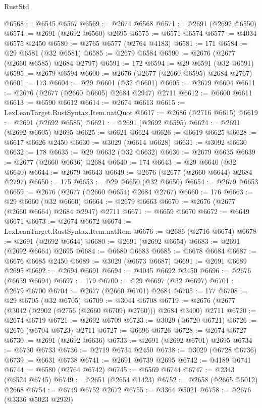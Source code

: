 \begin{lexlean}{RustStd}
\begin{coremodule}
@6568 := @6545 @6567
@6569 := @2674 @6568
@6571 := @2691 (@2692 @6550)
@6574 := @2691 (@2692 @6560) @2695
@6575 := @6571 @6574
@6577 := @4034 @6575 @2450
@6580 := @2765 @6577 (@2764 @4183)
@6581 := 171
@6584 := @29 @6581 (@32 @6581)
@6585 := @2679 @6584
@6590 := @2676 (@2677 (@2660 @6585) @2684 @2797)
@6591 := 172
@6594 := @29 @6591 (@32 @6591)
@6595 := @2679 @6594
@6600 := @2676 (@2677 (@2660 @6595) @2684 @2767)
@6601 := 173
@6604 := @29 @6601 (@32 @6601)
@6605 := @2679 @6604
@6611 := @2676 (@2677 (@2660 @6605) @2684 @2947) @2711
@6612 := @6600 @6611
@6613 := @6590 @6612
@6614 := @2674 @6613
@6615 := LexLeanTarget.RustSyntax.Item.natQuot
@6617 := @2686 (@2716 @6615)
@6619 := @2691 (@2692 @6585)
@6621 := @2691 (@2692 @6595)
@6624 := @2691 (@2692 @6605) @2695
@6625 := @6621 @6624
@6626 := @6619 @6625
@6628 := @6617 @6626 @2450
@6630 := @3029 (@6614 @6628)
@6631 := @3092 @6630
@6632 := 178
@6635 := @29 @6632 (@32 @6632)
@6636 := @2679 @6635
@6639 := @2677 (@2660 @6636) @2684
@6640 := 174
@6643 := @29 @6640 (@32 @6640)
@6644 := @2679 @6643
@6649 := @2676 (@2677 (@2660 @6644) @2684 @2797)
@6650 := 175
@6653 := @29 @6650 (@32 @6650)
@6654 := @2679 @6653
@6659 := @2676 (@2677 (@2660 @6654) @2684 @2767)
@6660 := 176
@6663 := @29 @6660 (@32 @6660)
@6664 := @2679 @6663
@6670 := @2676 (@2677 (@2660 @6664) @2684 @2947) @2711
@6671 := @6659 @6670
@6672 := @6649 @6671
@6673 := @2674 @6672
@6674 := LexLeanTarget.RustSyntax.Item.natRem
@6676 := @2686 (@2716 @6674)
@6678 := @2691 (@2692 @6644)
@6680 := @2691 (@2692 @6654)
@6683 := @2691 (@2692 @6664) @2695
@6684 := @6680 @6683
@6685 := @6678 @6684
@6687 := @6676 @6685 @2450
@6689 := @3029 (@6673 @6687)
@6691 := @2691 @6689 @2695
@6692 := @2694 @6691
@6694 := @4045 @6692 @2450
@6696 := @2676 (@6639 @6694)
@6697 := 179
@6700 := @29 @6697 (@32 @6697)
@6701 := @2679 @6700
@6704 := @2677 (@2660 @6701) @2684
@6705 := 177
@6708 := @29 @6705 (@32 @6705)
@6709 := @3044 @6708
@6719 := @2676 (@2677 (@3042 (@2902 (@2756 (@2660 @6709) @2760))) @2684 @3400) @2711
@6720 := @2674 @6719
@6721 := @2692 @6709
@6723 := @3029 (@6720 @6721)
@6726 := @2676 (@6704 @6723) @2711
@6727 := @6696 @6726
@6728 := @2674 @6727
@6730 := @2691 (@2692 @6636)
@6733 := @2691 (@2692 @6701) @2695
@6734 := @6730 @6733
@6736 := @2719 @6734 @2450
@6738 := @3029 (@6728 @6736)
@6739 := @6631 @6738
@6741 := @2691 @6739 @2695
@6742 := @4189 @6741
@6744 := @6580 (@2764 @6742)
@6745 := @6569 @6744
@6747 := @2343 (@6524 @6745)
@6749 := @2651 (@2654 @1423)
@6752 := @2658 (@2665 @5012) @2668
@6754 := @6749 @6752 @2672
@6755 := @3364 @5021
@6758 := @2676 (@3336 @5023 @2939)

\end{coremodule}
\end{lexlean}
